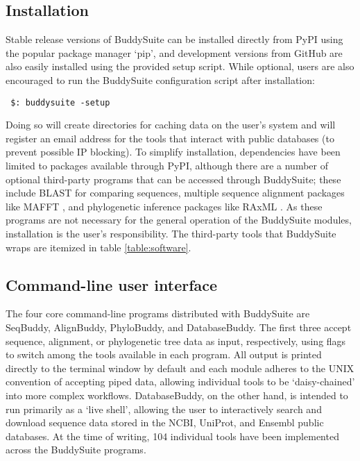 \documentclass[twocolumn]{bmcart}%
\begin{document}
\subsection*{Installation}
Stable release versions of BuddySuite can be installed directly from PyPI using the popular package manager `pip', and development versions from GitHub are also easily installed using the provided setup script. While optional, users are also encouraged to run the BuddySuite configuration script after installation: 

\smallskip

\begin{verbatim}
 $: buddysuite -setup
\end{verbatim}

\smallskip
Doing so will create directories for caching data on the user's system and will register an email address for the tools that interact with public databases (to prevent possible IP blocking). To simplify installation, dependencies have been limited to packages available through PyPI, although there are a number of optional third-party programs that can be accessed through BuddySuite; these include BLAST \cite{Camacho2009} for comparing sequences, multiple sequence alignment packages like MAFFT \cite{Katoh:2013hm}, and phylogenetic inference packages like RAxML \cite{Stamatakis:2006de}. As these programs are not necessary for the general operation of the BuddySuite modules, installation is the user's responsibility. The third-party tools that BuddySuite wraps are itemized in table \ref{table:software}.

\subsection*{Command-line user interface}
The four core command-line programs distributed with BuddySuite are SeqBuddy, AlignBuddy, PhyloBuddy, and DatabaseBuddy. The first three accept sequence, alignment, or phylogenetic tree data as input, respectively, using flags to switch among the tools available in each program. All output is printed directly to the terminal window by default and each module adheres to the UNIX convention of accepting piped data, allowing individual tools to be `daisy-chained' into more complex workflows. DatabaseBuddy, on the other hand, is intended to run primarily as a `live shell', allowing the user to interactively search and download sequence data stored in the NCBI, UniProt, and Ensembl public databases. At the time of writing, 104 individual tools have been implemented across the BuddySuite programs.
\end{document}
